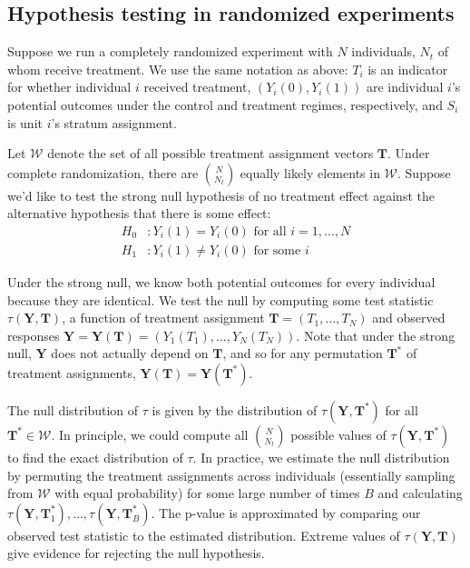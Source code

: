 \documentclass[12pt]{article}
\begin{document}
\subsection{Hypothesis testing in randomized experiments}
Suppose we run a completely randomized experiment with $N$ individuals, $N_t$ of whom receive treatment.
We use the same notation as above: $T_i$ is an indicator for whether individual $i$ received treatment, $(Y_i(0), Y_i(1))$ are individual $i$'s potential outcomes under the control and treatment regimes, respectively, and $S_i$ is unit $i$'s stratum assignment. 

Let $\mathcal{W}$ denote the set of all possible treatment assignment vectors $\mathbf{T}$.
Under complete randomization, there are ${N \choose N_t}$ equally likely elements in $\mathcal{W}$.
Suppose we'd like to test the strong null hypothesis of no treatment effect against the alternative hypothesis that there is some effect:
\begin{align}
H_0&: Y_i(1) = Y_i(0) \text{ for all } i = 1,\dots,N \label{strongh0} \\
H_1&: Y_i(1) \neq Y_i(0) \text{ for some } i \label{strongh1}
\end{align}

Under the strong null, we know both potential outcomes for every individual because they are identical.
We test the null by computing some test statistic $\tau(\mathbf{Y}, \mathbf{T})$, a function of treatment assignment 
$\mathbf{T} = (T_1, \dots, T_N)$ and observed responses $\mathbf{Y} = \mathbf{Y}(\mathbf{T}) = (Y_1(T_1), \dots, Y_N(T_N))$.
Note that under the strong null, $\mathbf{Y}$ does not actually depend on $\mathbf{T}$, and so for any permutation $\mathbf{T}^*$ of treatment assignments, $\mathbf{Y}(\mathbf{T}) = \mathbf{Y}(\mathbf{T}^*)$.

The null distribution of $\tau$ is given by the distribution of $\tau(\mathbf{Y}, \mathbf{T}^*)$ for all $\mathbf{T}^* \in \mathcal{W}$.
In principle, we could compute all ${N \choose N_t}$ possible values of $\tau(\mathbf{Y}, \mathbf{T}^*)$ to find the exact distribution of $\tau$.
In practice, we estimate the null distribution by permuting the treatment assignments across individuals (essentially sampling from $\mathcal{W}$ with equal probability) for some large number of times $B$ and calculating $\tau(\mathbf{Y}, \mathbf{T}^*_1), \dots,\tau(\mathbf{Y}, \mathbf{T}^*_B)$.
The p-value is approximated by comparing our observed test statistic to the estimated distribution.
Extreme values of $\tau(\mathbf{Y}, \mathbf{T})$ give evidence for rejecting the null hypothesis. 
\end{document}
